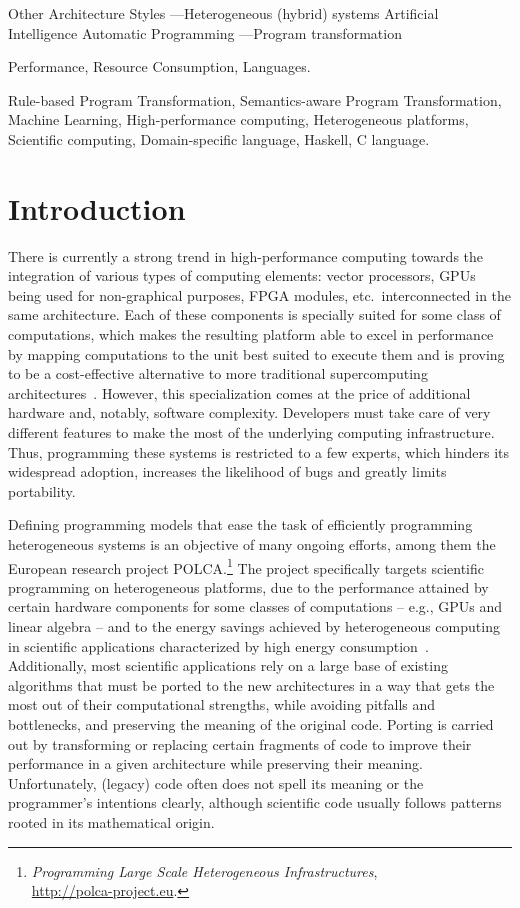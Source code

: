 \documentclass[svgnames,usenames,preprint,nocopyrightspace]{sigplanconf}
\begin{document}
         {Other Architecture Styles}
         {---Heterogeneous (hybrid) systems} 
         {Artificial Intelligence}
         {Automatic Programming}
         {---Program transformation}


\terms
Performance, Resource Consumption, Languages.

\keywords
Rule-based Program Transformation,
Semantics-aware Program Transformation,
Machine Learning,
High-performance computing,
Heterogeneous platforms,
Scientific computing, Domain-specific language, Haskell, C language.



\section{Introduction}
There is currently a strong trend in high-performance computing
towards the integration of various types of computing elements: vector
processors, GPUs being used for non-graphical purposes, FPGA modules,
etc.\ interconnected in the same architecture.  Each of these
components is specially suited for some class of computations, which
makes the resulting platform able to excel in performance by mapping
computations to the unit best suited to execute them and is proving to be
a cost-effective alternative to more traditional supercomputing
architectures~\cite{danalis2010-shoc-benchmark}.  However, this
specialization comes at the price of additional hardware and, notably,
software complexity.  Developers must take care of very different
features to make the most of the underlying computing
infrastructure.  Thus, programming these systems is restricted to a few
experts, which hinders its widespread adoption, increases the
likelihood of bugs and greatly limits portability.

Defining programming models that ease the task of efficiently
programming heterogeneous systems is an objective of many ongoing
efforts, among them the
European research project POLCA.\footnote{\emph{Programming Large Scale Heterogeneous Infrastructures},\\ 
  \url{http://polca-project.eu}.}
The project specifically targets scientific programming on   
heterogeneous platforms, due to the performance 
attained by certain hardware components for some classes of
computations -- e.g., GPUs and linear algebra -- and to the energy
savings achieved by heterogeneous computing in scientific
applications characterized by high energy
consumption~\cite{danalis2010-shoc-benchmark,lindtjorn2011-beyond-micro}.
Additionally, most scientific applications rely on a large base of
existing algorithms that must be ported to the new architectures in a
way that gets the most out of their computational strengths, while
avoiding pitfalls and bottlenecks, and preserving the meaning of the
original code.
Porting is carried out by transforming or replacing certain fragments
of code to improve their performance in a given architecture while
preserving their meaning.
Unfortunately, (legacy) code often does not spell its meaning or the
programmer's intentions clearly, although scientific code usually
follows patterns rooted in its mathematical origin.
\end{document}
